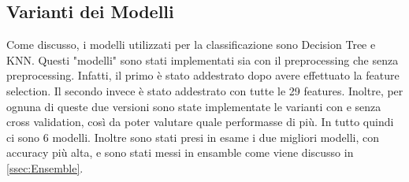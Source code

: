 \subsection{Varianti dei Modelli}

Come discusso, i modelli utilizzati per la classificazione sono Decision Tree e KNN.
\newline Questi "modelli" sono stati implementati sia con il preprocessing che senza preprocessing. Infatti, il primo è stato addestrato dopo avere effettuato la feature selection. Il secondo invece è stato addestrato con tutte le 29 features. Inoltre, per ognuna di queste due versioni sono state implementate le varianti con e senza cross validation, così da poter valutare quale performasse di più. In tutto quindi ci sono 6 modelli. Inoltre sono stati presi in esame i due migliori modelli, con accuracy più alta, e sono stati messi in ensamble come viene discusso in \ref{ssec:Ensemble}.

